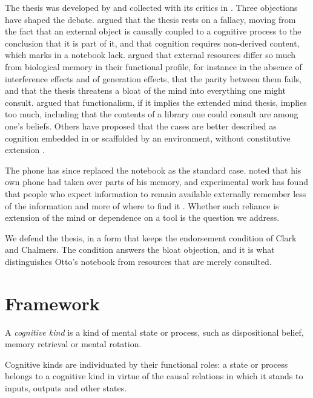 \documentclass{situationist-preprint}
\begin{document}
The thesis was developed by \citet{Clark2008} and collected with its critics in \citet{Menary2010}. Three objections have shaped the debate. \citet{AdamsAizawa2001,AdamsAizawa2008} argued that the thesis rests on a fallacy, moving from the fact that an external object is causally coupled to a cognitive process to the conclusion that it is part of it, and that cognition requires non-derived content, which marks in a notebook lack. \citet{Rupert2004} argued that external resources differ so much from biological memory in their functional profile, for instance in the absence of interference effects and of generation effects, that the parity between them fails, and that the thesis threatens a bloat of the mind into everything one might consult. \citet{Sprevak2009} argued that functionalism, if it implies the extended mind thesis, implies too much, including that the contents of a library one could consult are among one's beliefs. Others have proposed that the cases are better described as cognition embedded in or scaffolded by an environment, without constitutive extension \citep{Sterelny2010}.

The phone has since replaced the notebook as the standard case. \citet{Chalmers2008} noted that his own phone had taken over parts of his memory, and experimental work has found that people who expect information to remain available externally remember less of the information and more of where to find it \citep{SparrowLiuWegner2011}. Whether such reliance is extension of the mind or dependence on a tool is the question we address.

We defend the thesis, in a form that keeps the endorsement condition of Clark and Chalmers. The condition answers the bloat objection, and it is what distinguishes Otto's notebook from resources that are merely consulted.

\section{Framework}

\begin{definition}\label{d:kind}
A \emph{cognitive kind} is a kind of mental state or process, such as dispositional belief, memory retrieval or mental rotation.
\end{definition}

\begin{principle}\label{p:func}
Cognitive kinds are individuated by their functional roles: a state or process belongs to a cognitive kind in virtue of the causal relations in which it stands to inputs, outputs and other states.
\end{principle}
\end{document}
